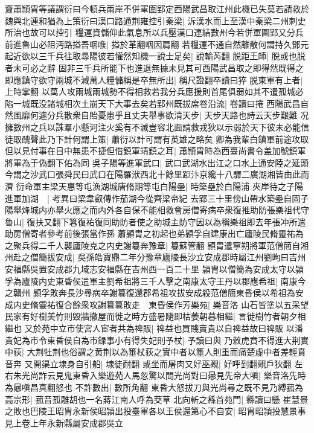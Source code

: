 齎蕭頴胄等議謂衍曰今頓兵兩岸不併軍圍郢定西陽武昌取江州此機已失莫若請救於魏與北連和猶為上策衍曰漢口路通荆雍控引秦梁|{
	泝漢水而上至漢中秦梁二州刺史所治也故可以控引}
糧運資儲仰此氣息所以兵壓漢口連結數州今若併軍圍郢又分兵前進魯山必阻沔路搤吾咽㗋|{
	搤於革翻咽因肩翻}
若糧運不通自然離散何謂持久鄧元起近欲以三千兵往取尋陽彼若懽然知機一說士足矣|{
	說輸芮翻}
脱距王師|{
	脱或也脱者未可必之辭}
固非三千兵所能下也進退無據未見其可西陽武昌取之即得然既得之即應鎮守欲守兩城不減萬人糧儲稱是卒無所出|{
	稱尺證翻卒讀曰猝}
脱東軍有上者|{
	上時掌翻}
以萬人攻兩城兩城勢不得相救若我分兵應援則首尾俱弱如其不遣孤城必陷一城既没諸城相次土崩天下大事去矣若郢州既拔席卷沿流|{
	卷讀曰捲}
西陽武昌自然風靡何遽分兵散衆自貽憂患乎且丈夫舉事欲清天步|{
	天步天路也詩云天步艱難}
况擁數州之兵以誅羣小懸河注火奚有不滅豈容北面請救戎狄以示弱於天下彼未必能信徒取醜聲此乃下計何謂上策|{
	蕭衍以計可謂有英雄之略矣}
卿為我輩白鎮軍前途攻取但以見付事在目中無患不捷但借鎮軍靖鎮之耳|{
	蕭頴胄時為西臺尚書令盖加號鎮軍將軍為于偽翻下佑為同}
吳子陽等進軍武口|{
	武口武湖水出江之口水上通安陸之延頭今謂之沙武口張舜民曰武口在陽羅洑西北十餘里距汴京纔十八驛二廣湖湘皆由此而濟}
衍命軍主梁天惠等屯漁湖城唐脩期等屯白陽壘|{
	時築壘於白陽浦}
夾岸待之子陽進軍加湖　|{
	考異曰梁韋叡傳作茄湖今從齊梁帝紀}
去郢三十里傍山帶水築壘自固子陽舉烽城内亦舉火應之而内外各自保不能相救會房僧寄病卒衆復推助防張樂祖代守魯山|{
	復扶又翻下篹復祐復同助防者使之助城主防守因以為稱樂祖即去年張冲所遣助房僧寄者參考前後張當作孫}
蕭頴胄之初起也弟頴孚自建康出亡廬陵民脩靈祐為之聚兵得二千人襲廬陵克之内史謝篹奔豫章|{
	篹蘇管翻}
頴胄遣寧朔將軍范僧簡自湘州赴之僧簡拔安成|{
	吳孫皓寶鼎二年分豫章廬陵長沙立安成郡時屬江州劉昫曰吉州安福縣吳置安成郡九域志安福縣在吉州西一百二十里}
頴胄以僧簡為安成太守以頴孚為廬陵内史東昏侯遣軍主劉希祖將三千人擊之南康太守王丹以郡應希祖|{
	南康今之贛州}
頴孚敗奔長沙尋病卒謝篹復還郡希祖攻拔安成殺范僧簡東昏侯以希祖為安成内史脩靈祐復合餘衆攻謝篹篹敗走　東昏侯作芳樂苑|{
	樂音洛}
山石皆塗以五采望民家有好樹美竹則毁牆撤屋而徙之時方盛暑隨即枯萎朝暮相繼|{
	言徙樹竹者朝夕相繼也}
又於苑中立市使宮人宦者共為禆販|{
	禆益也買賤賣貴以自禆益故曰禆販}
以潘貴妃為市令東昏侯自為市録事小有得失妃則予杖|{
	予讀曰與}
乃敕虎賁不得進大荆實中荻|{
	大荆牡荆也俗謂之黄荆以為箠杖荻之實中者以箠人則重而痛楚虛中者差輕賁音奔}
又開渠立埭身自引船|{
	埭徒耐翻}
或坐而屠肉又好巫覡|{
	好呼到翻覡戶狄翻}
左右朱光尚詐云見鬼東昏入樂遊苑人馬忽驚以問光尚對曰曏見先帝大嗔|{
	樂音洛先時為曏嗔昌真翻怒也}
不許數出|{
	數所角翻}
東昏大怒拔刀與光尚尋之既不見乃縛菰為高宗形|{
	菰音孤雕胡也一名蔣江南人呼為茭草}
北向斬之縣首苑門|{
	縣讀曰懸}
崔慧景之敗也巴陵王昭胄永新侯昭頴出投臺軍各以王侯還第心不自安|{
	昭胄昭頴投慧景事見上卷上年永新縣屬安成郡吳立}
